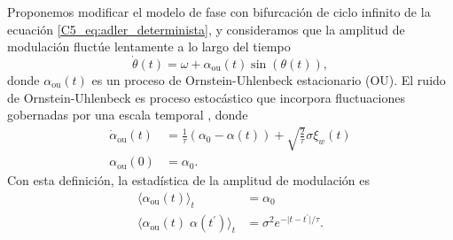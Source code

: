 \documentclass[./main.tex]{subfiles}
\begin{document}
Proponemos modificar el modelo de fase con bifurcación de ciclo infinito de la ecuación \ref{C5_eq:adler_determinista}, y consideramos que la amplitud de modulación fluctúe lentamente a lo largo del tiempo
\begin{equation}
    \dot{\theta}(t) = \omega + \alpha_{\text{ou}}(t) \sin{(\theta(t))},
    \label{C7_eq:alpha_ou}
\end{equation}
donde $\alpha_{\text{ou}}(t)$ es un proceso de Ornstein-Uhlenbeck estacionario (OU). El ruido de Ornstein-Uhlenbeck es proceso estocástico que incorpora fluctuaciones gobernadas por una escala temporal \cite{SanMiguel2000}, donde 
\begin{align}
    \dot\alpha_{\text{ou}}(t) &= \frac{1}{\tau} (\alpha_0 - \alpha(t)) + \sqrt{\frac{2}{\tau}}\sigma \xi_w(t) \label{C7_eq:OU_langevin}\\
    \alpha_{\text{ou}}(0) &= \alpha_0.
\end{align}
Con esta definición, la estadística de la amplitud de modulación es
\begin{align}
    \langle \alpha_{\text{ou}}(t) \rangle_t &= \alpha_0 \label{C7_eq:OU_mean}\\
    \langle \alpha_{\text{ou}}(t) \; \alpha(t^\prime) \rangle_t &= \sigma^2 e^{- \lvert t-t^\prime \rvert / \tau } \label{C7_eq:OU_corr}.
\end{align}
\end{document}
